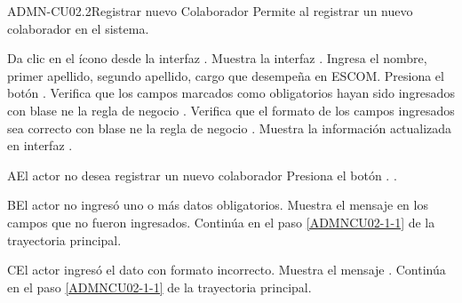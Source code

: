 \begin{UseCase}{ADMN-CU02.2}{Registrar nuevo Colaborador}{
	Permite al registrar un nuevo colaborador en el sistema.
}
	  

\end{UseCase}

\begin{UCtrayectoria}
	\UCpaso [\UCactor] Da clic en el ícono \IUAgregar{} desde la interfaz .
	\UCpaso [\UCsist] Muestra la interfaz .
	\UCpaso [\UCactor] \label{ADMNCU02-1-1} Ingresa el nombre, primer apellido, segundo apellido, cargo que desempeña en ESCOM.
	\UCpaso [\UCactor] Presiona el botón .
	\UCpaso Verifica que los campos marcados como obligatorios hayan sido ingresados con blase ne la regla de negocio .
	\UCpaso Verifica que el formato de los campos ingresados sea correcto con blase ne la regla de negocio .
    \UCpaso [\UCsist] Muestra la información actualizada en interfaz .
	
\end{UCtrayectoria}

\begin{UCtrayectoriaA}{A}{El actor no desea registrar un nuevo colaborador}
	\UCpaso [\UCsist] Presiona el botón .
	.
\end{UCtrayectoriaA} 

\begin{UCtrayectoriaA}{B}{El actor no ingresó uno o más datos obligatorios.}
	\UCpaso [\UCsist] Muestra el mensaje  en los campos que no fueron ingresados.
	\UCpaso [\UCsist] Continúa en el paso \ref{ADMNCU02-1-1} de la trayectoria principal.
\end{UCtrayectoriaA} 

\begin{UCtrayectoriaA}{C}{El actor ingresó el dato con formato incorrecto.}
	\UCpaso [\UCsist] Muestra el mensaje .
	\UCpaso [\UCsist] Continúa en el paso \ref{ADMNCU02-1-1} de la trayectoria principal.
\end{UCtrayectoriaA}


